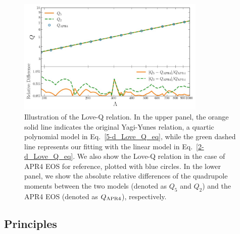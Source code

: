 \documentclass[a4paper,11pt]{article}
\begin{document}
\begin{figure}[tbp]
\centering
\includegraphics[width=0.8\textwidth]{fig_2d-5d_difference.pdf}%
\caption{Illustration of the Love-Q relation. In the upper panel, the orange
solid line indicates the original Yagi-Yunes relation, a quartic polynomial model
 in
Eq.~\eqref{5-d_Love_Q_eq}, while the green dashed line represents our fitting
with the linear model in Eq.~\eqref{2-d_Love_Q_eq}. We also show the Love-Q
relation in the case of APR4 EOS for reference, plotted with blue circles.
In the lower panel, we show the absolute relative differences of the quadrupole
moments
between the two
models (denoted as $Q_5$ and $Q_2$) and the APR4 EOS (denoted as $Q_{\rm
APR4}$), respectively.}\label{relative_difference}
\end{figure}

\subsection{Principles}
\label{subsec:framework_principles}
\end{document}
